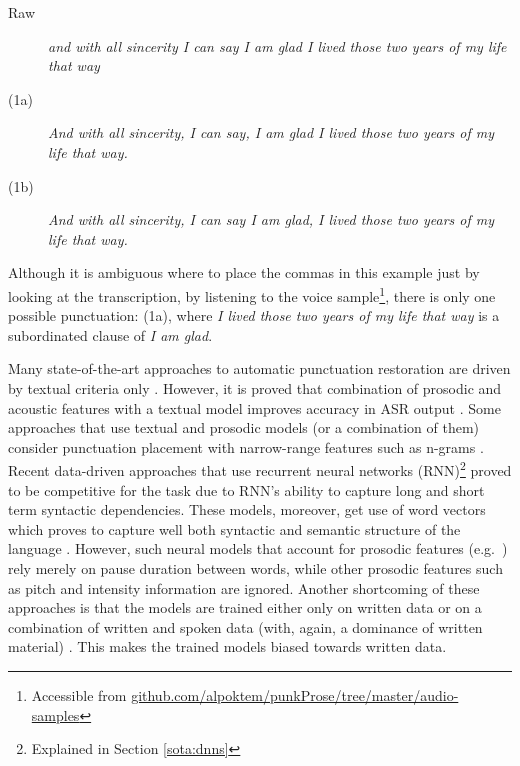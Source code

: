 \begin{description}
\item [Raw] {\it and with all sincerity I can say I am glad I lived those two years of my life that way} 
\item [(1a)] {\it And with all sincerity, I can say, I am glad I lived those two years of my life that way.}
\item [(1b)] {\it And with all sincerity, I can say I am glad, I lived those two years of my life that way.}
\end{description}

\noindent Although it is ambiguous where to place the commas in this example just by looking at the transcription, by listening to the voice sample\footnote{Accessible from \url{github.com/alpoktem/punkProse/tree/master/audio-samples}}, there is only one possible punctuation: (1a), where {\it I lived those two years of my life that way} is a subordinated clause of {\it I am glad}. 

Many state-of-the-art approaches to automatic punctuation restoration are driven by textual criteria only \citep{Cho2017NMTbasedSA, lu2010better, ueffing2013improved, Gravano,  jakubicek2010punctuation, Che2016PunctuationPF}. However, it is proved that combination of prosodic and acoustic features with a textual model improves accuracy in ASR output \citep{baron2002automatic, khomitsevich2015combining, tilk2015lstm, tilk2016bidirectional}. Some approaches that use textual and prosodic models (or a combination of them) consider punctuation placement with narrow-range features such as n-grams \citep{liu2006study, khomitsevich2015combining, Psutka04automaticpunctuation}. Recent data-driven approaches that use recurrent neural networks (RNN)\footnote{Explained in Section \ref{sota:dnns}} proved to be competitive for the task due to RNN's ability to capture long and short term syntactic dependencies. These models, moreover, get use of word vectors which proves to capture well both syntactic and semantic structure of the language \citep{Treviso, Che2016PunctuationPF}. However, such neural models that account for prosodic features (e.g.~\cite{tilk2015lstm, tilk2016bidirectional}) rely merely on pause duration between words, while other prosodic features such as pitch and intensity information are ignored. Another shortcoming of these approaches is that the models are trained either only on written data \citep{ballesterosneural, Che2016PunctuationPF} or on a combination of written and spoken data (with, again, a dominance of written material) \citep{tilk2016bidirectional}. This makes the trained models biased towards written data. 

